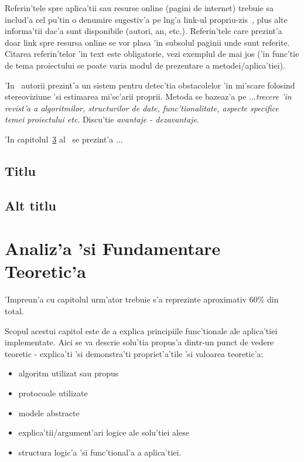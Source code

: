 \documentclass[12pt,a4paper,twoside]{report}
\begin{document}
Referin'tele spre aplica'tii sau resurse online (pagini de internet) trebuie sa includ'a cel pu'tin o denumire sugestiv'a pe l\ia ng'a link-ul propriu-zis~\cite{webpage}, 
plus alte informa'tii dac'a sunt disponibile (autori, an, etc.). 
Referin'tele care prezint'a doar link spre resursa online se vor plasa 'in subsolul paginii unde sunt referite.
Citarea referin'telor 'in text este obligatorie, vezi exemplul de mai jos ('in func'tie de tema proiectului se poate varia modul de prezentare a metodei/aplica'tiei).

'In~\cite{AntoniouSBDB07} autorii prezint'a un sistem pentru detec'tia obstacolelor 'in mi'scare folosind stereoviziune 'si estimarea mi'sc'arii proprii. 
Metoda se bazeaz'a pe ...{\it trecere 'in revist'a a algoritmilor, structurilor de date, func'tionalitate, aspecte specifice temei proiectului etc}. Discu'tie {\it avantaje - dezavantaje}.


'In capitolul~\ref{ch:analysis} al~\cite{russell1995artificial} se prezint'a ...  


\section{Titlu}
\section{Alt titlu}


\chapter{Analiz'a 'si Fundamentare Teoretic'a}
\label{ch:analysis}

'Impreun'a cu capitolul urm'ator trebuie s'a reprezinte aproximativ 60\% din total.

Scopul acestui capitol este de a explica principiile func'tionale ale aplica'tiei implementate. 
Aici se va descrie solu'tia propus'a dintr-un punct de vedere teoretic - explica'ti 'si demonstra'ti propriet'a'tile 'si valoarea teoretic'a:
\begin{itemize}
 \item algoritm utilizat sau propus
\item protocoale utilizate
\item modele abstracte
\item explica'tii/argument'ari logice ale solu'tiei alese
\item structura logic'a 'si func'tional'a a aplica'tiei.
\end{itemize}
\end{document}
